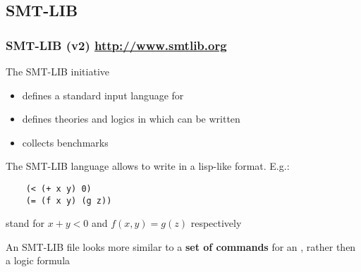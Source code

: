 \subsection{SMT-LIB}

\begin{frame}[fragile]
  \frametitle{SMT-LIB (v2) \url{http://www.smtlib.org}}

  The SMT-LIB initiative 
  \begin{itemize}
    \item defines a standard input language for \smtsolvers
    \item defines theories and logics in which \formulae can be written
    \item collects benchmarks 
  \end{itemize}

  \vfill
  \pause
  The SMT-LIB language allows to write \formulae in a lisp-like format. E.g.:
  \begin{verbatim}
    (< (+ x y) 0)
    (= (f x y) (g z))
  \end{verbatim} 
  stand for $x + y < 0$ and $f(x,y) = g(z)$ respectively

  \vfill
  \pause
  An SMT-LIB file looks more similar to a {\bf set of commands} for
  an \smtsolver, rather then a logic formula

\end{frame}

